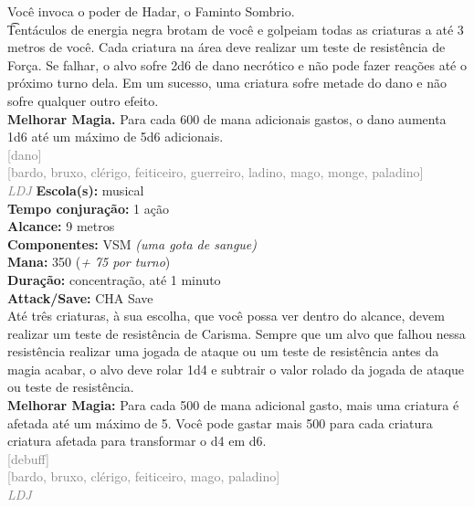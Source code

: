 \documentclass{RPG_Adventure}[2021/10/20]
\begin{document}
{\normalsize Você invoca o poder de Hadar, o Faminto Sombrio.\\\t Tentáculos de energia negra brotam de você e golpeiam todas as criaturas a até 3 metros de você. Cada criatura na área deve realizar um teste de resistência de Força. Se falhar, o alvo sofre 2d6 de dano necrótico e não pode fazer reações até o próximo turno dela. Em um sucesso, uma criatura sofre metade do dano e não sofre qualquer outro efeito.\\\t \textbf{Melhorar Magia.} Para cada 600 de mana adicionais gastos, o dano aumenta 1d6 até um máximo de 5d6 adicionais.\\}
{\scriptsize \textcolor{gray}{[dano]\\}}
{\scriptsize \textcolor{gray}{[bardo, bruxo, clérigo, feiticeiro, guerreiro, ladino, mago, monge, paladino]\\}}
{\tiny \textcolor{gray}{\textit{LDJ}}}
{\small \t \textbf{Escola(s):} musical\\\t \textbf{Tempo conjuração:} 1 ação\\\t \textbf{Alcance:} 9 metros\\\t \textbf{Componentes:} VSM \textit{(uma gota de sangue)}\\\t \textbf{Mana:} 350 (\textit{+ 75 por turno})\\\t \textbf{Duração:} concentração, até 1 minuto\\\t \textbf{Attack/Save:} CHA Save\\}
{\normalsize Até três criaturas, à sua escolha, que você possa ver dentro do alcance, devem realizar um teste de resistência de Carisma. Sempre que um alvo que falhou nessa resistência realizar uma jogada de ataque ou um teste de resistência antes da magia acabar, o alvo deve rolar 1d4 e subtrair o valor rolado da jogada de ataque ou teste de resistência.\\\t \textbf{Melhorar Magia:} Para cada 500 de mana adicional gasto, mais uma criatura é afetada até um máximo de 5. Você pode gastar mais 500 para cada criatura criatura afetada para transformar o d4 em d6.\\}
{\scriptsize \textcolor{gray}{[debuff]\\}}
{\scriptsize \textcolor{gray}{[bardo, bruxo, clérigo, feiticeiro, mago, paladino]\\}}
{\tiny \textcolor{gray}{\textit{LDJ}}}
\end{document}
